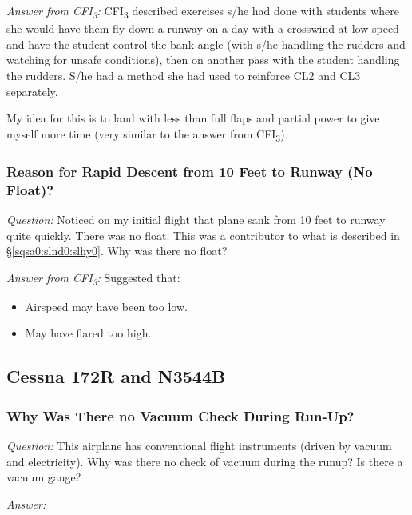 \documentclass[letterpaper,10pt,titlepage]{article}
\begin{document}
\noindent{}\emph{Answer from CFI\textsubscript{3}:}
CFI\textsubscript{3} described exercises s/he had done with students where she
would have them fly down a runway on a day with a crosswind at low speed and
have the student control the bank angle (with s/he
handling the rudders and watching for unsafe conditions), then on another
pass with the student handling the rudders.  S/he had a method she had used
to reinforce CL2 and CL3 separately.

My idea for this is to land with less than full flaps and partial power to give
myself more time (very similar to the answer from CFI\textsubscript{3}).



\subsubsection{Reason for Rapid Descent from 10 Feet to Runway (No Float)?}
\label{sqsa0:slnd0:srdf0}

\emph{Question:} Noticed on my initial flight that plane sank from 10 feet
to runway quite quickly.  There was no float.  This was a contributor to
what is described in \S{}\ref{sqsa0:slnd0:slhy0}.  Why was there no float?

\noindent{}\emph{Answer from CFI\textsubscript{3}:}  Suggested that:
\begin{itemize}
\item Airspeed may have been too low.
\item May have flared too high.
\end{itemize}


\subsection{Cessna 172R and N3544B}
\label{sqsa0:sc7r0}


\subsubsection{Why Was There no Vacuum Check During Run-Up?}
\label{sqsa0:sc7r0:slhy0}

\emph{Question:} This airplane has conventional flight instruments (driven by
vacuum and electricity).  Why was there no check of vacuum during the runup?  Is
there a vacuum gauge?

\noindent{}\emph{Answer:}


%
%
\clearpage
{}
\printindex
\end{document}
